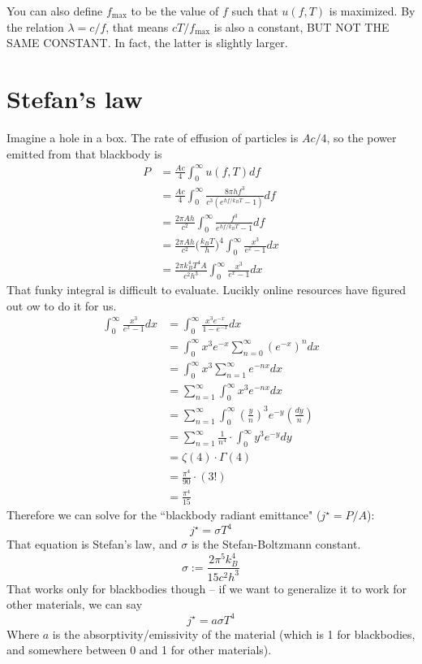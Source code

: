 \documentclass[12pt]{article}
\begin{document}
You can also define $f_\text{max}$ to be the value of $f$ such that $u(f, T)$ is maximized. By the relation $\lambda = c / f$, that means $c T / f_\text{max}$ is also a constant, BUT NOT THE SAME CONSTANT. In fact, the latter is slightly larger.

\section{Stefan's law}
Imagine a hole in a box. The rate of effusion of particles is $A c / 4$, so the power emitted from that blackbody is
\begin{align*}
    P &= \frac{A c}{4} \int_0^\infty u(f, T) df \\
      &= \frac{A c}{4} \int_0^\infty \frac{8 \pi h f^3}{c^3 (e^{hf/k_B T} - 1)}  df \\
      &= \frac{2 \pi A h}{c^2} \int_0^\infty \frac{f^3}{e^{hf/k_B T} - 1} df \\
      &= \frac{2 \pi A h}{c^2} \Bigg( \frac{k_B T}{h} \Bigg)^4 \int_0^\infty \frac{x^3}{e^x - 1} dx \\
      &= \frac{2 \pi k_B^4 T^4 A}{c^2 h^3} \int_0^\infty \frac{x^3}{e^x - 1} dx
\end{align*}
That funky integral is difficult to evaluate. Lucikly online resources have figured out ow to do it for us.
\begin{align*}
    \int_0^\infty \frac{x^3}{e^x - 1} dx &= \int_0^\infty \frac{x^3 e^{-x}}{1 - e^{-x}} dx \\
    &= \int_0^\infty x^3 e^{-x} \sum_{n=0}^\infty (e^{-x})^n dx \\
    &= \int_0^\infty x^3 \sum_{n=1}^\infty e^{-nx} dx \\
    &= \sum_{n=1}^\infty \int_0^\infty x^3 e^{-nx} dx \\
    &= \sum_{n=1}^\infty \int_0^\infty \left( \frac{y}{n} \right)^3 e^{-y} \left( \frac{dy}{n} \right) \\
    &= \sum_{n=1}^\infty \frac{1}{n^4} \cdot \int_0^\infty y^3 e^{-y} dy \\
    &= \zeta(4) \cdot \Gamma(4) \\
    &= \frac{\pi^4}{90} \cdot (3!) \\
    &= \frac{\pi^4}{15}
\end{align*}
Therefore we can solve for the ``blackbody radiant emittance" ($j^\star = P / A$):
\[ j^\star = \sigma T^4 \]
That equation is Stefan's law, and $\sigma$ is the Stefan-Boltzmann constant.
\[ \sigma := \frac{2 \pi^5 k_B^4}{15 c^2 h^3} \]
That works only for blackbodies though -- if we want to generalize it to work for other materials, we can say
\[ j^\star = a \sigma T^4 \]
Where $a$ is the absorptivity/emissivity of the material (which is 1 for blackbodies, and somewhere between 0 and 1 for other materials).
\end{document}
